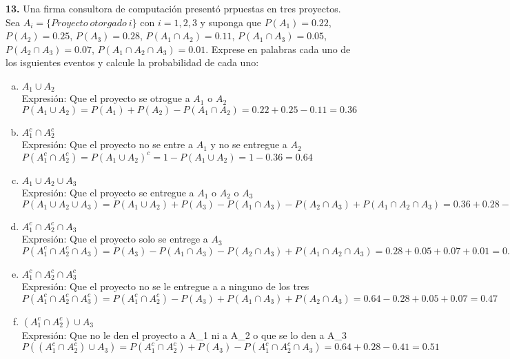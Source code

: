 \documentclass[12pt, letterpaper, spanish]{article}
\begin{document}
\textbf{13.} Una firma consultora de computación presentó prpuestas en tres proyectos. Sea $A_i = \{Proyecto\ otorgado\ i \}$ con $i=1,2,3$ y suponga que $P(A_1)=0.22$, $P(A_2)=0.25$, $P(A_3)=0.28$, $P(A_1\cap A_2)=0.11$, $P(A_1\cap A_3)=0.05$, $P(A_2\cap A_3)=0.07$, $P(A_1\cap A_2\cap A_3)=0.01$. Exprese en palabras cada uno de los isguientes eventos y calcule la probabilidad de cada uno:
\begin{enumerate}[a)]
    \item $A_1\cup A_2$\\
    Expresión: Que el proyecto se otrogue a $A_1$ o $A_2$\\
     $P(A_1\cup A_2)= P(A_1)+P(A_2)-P(A_1\cap A_2)= 0.22 + 0.25 - 0.11 = 0.36$
    \item $A_1^c\cap A_2^c$\\
    Expresión: Que el proyecto no se entre a $A_1$ y no se entregue a $A_2$\\
    $P(A_1^c\cap A_2^c)= P(A_1\cup A_2)^c = 1 - P(A_1\cup A_2) = 1 - 0.36 = 0.64$
    \item $A_1\cup A_2\cup A_3$\\
    Expresión: Que el proyecto se entregue a $A_1$ o $A_2$ o $A_3$\\
    $P(A_1\cup A_2\cup A_3)= P(A_1\cup A_2) + P(A_3) - P(A_1\cap A_3) - P(A_2\cap A_3) + P(A_1\cap A_2\cap A_3)= 0.36 + 0.28 -0.05 - 0.07 + 0.01= 0.53$
    \item $A_1^c\cap A_2^c\cap A_3$\\
    Expresión: Que el proyecto solo se entrege a $A_3$\\
    $P(A_1^c\cap A_2^c\cap A_3)= P(A_3)- P(A_1\cap A_3) - P(A_2\cap A_3) + P(A_1\cap A_2\cap A_3) = 0.28 + 0.05 + 0.07 + 0.01 = 0.41$
    \item $A_1^c\cap A_2^c\cap A_3^c$\\
    Expresión: Que el proyecto no se le entregue a a ninguno de los tres\\
     $P(A_1^c\cap A_2^c\cap A_3^c) = P(A_1^c\cap A_2^c) - P(A_3) + P(A_1\cap A_3) + P(A_2\cap A_3) = 0.64 - 0.28 + 0.05 + 0.07 = 0.47$
    \item $(A_1^c\cap A_2^c)\cup A_3$\\
    Expresión: Que no le den el proyecto a A_1 ni a A_2 o que se lo den a A_3
    $P((A_1^c\cap A_2^c)\cup A_3)= P(A_1^c\cap A_2^c)+P(A_3)- P(A_1^c\cap A_2^c\cap A_3)= 0.64+0.28-0.41=0.51$

\end{enumerate}
\end{document}
